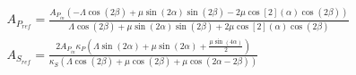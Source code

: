 \begin{solution}
    \begin{align*}
        &A_{P_{ref}} = \frac{
            A_{P_{in}} (- \Lambda \cos(2 \beta) + \mu \sin(2\alpha)\sin(2\beta) - 2 \mu \cos[2](\alpha) \cos(2\beta))
        }{
            \Lambda \cos(2 \beta) + \mu \sin(2 \alpha) \sin(2\beta) + 2 \mu \cos[2](\alpha) \cos(2 \beta)
        } \\
        &A_{S_{ref}} = \frac{
            2 A_{P_{in}} \kappa_P (\Lambda \sin(2 \alpha) + \mu \sin(2 \alpha) + \frac{\mu \sin(4 \alpha)}{2})
        }{
            \kappa_S (\Lambda \cos(2 \beta) + \mu \cos(2 \beta) + \mu \cos(2\alpha - 2\beta) )
        }\\
    \end{align*}
\end{solution}